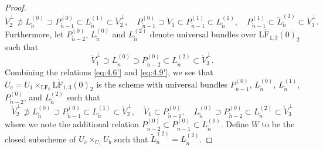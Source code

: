 \documentclass[a4paper]{amsart}
\theoremstyle{plain}
\theoremstyle{definition}
\numberwithin{equation}{section}
\newcommand{\LF}{\mathrm{LF}}
\newcommand{\LFo}{\mathrm{L}\mathring{\mathrm{F}}}
\begin{document}
\begin{proof}
    \begin{equation}\label{eq:4.8'}  	\mathring{V}_2^\perp \not\supset  L_{\mathring{n}}^{(0)} \supset P_{\mathring{n}-1}^{(0)} \subset L_{\mathring{n}}^{(1)} \subset \mathring{V}_2^\perp, \quad    P_{\mathring{n}-1}^{(0)}  \supset 	\mathring{V}_1 \subset   P_{\mathring{n}-1}^{(1)} \subset  L_{\mathring{n}}^{(1)} ,  \quad  P_{\mathring{n}-1}^{(1)} \subset \tilde{L}_{\mathring{n}}^{(2)} \subset \mathring{V}_3^\perp.\end{equation}
    Furthermore, let $P_{\mathring{n}-2}^{(0)}$, $L_{\mathring{n}}^{(0)}$ and ${L}_{\mathring{n}}^{(2)}$ denote universal bundles over $\LFo_{1,3}(0)_2$ such that
    \begin{equation}\label{eq:4.9'}
        \mathring{V}_1^\perp \supset  L_{\mathring{n}}^{(0)} \supset  P_{\mathring{n}-2}^{(0)} \subset {L}_{\mathring{n}}^{(2)} \subset \mathring{V}_3^\perp.  \end{equation}
    Combining the relations \eqref{eq:4.6'} and \eqref{eq:4.9'}, we see that $U_c = U_1 \times_{\LF_0} \LFo_{1,3}(0)_2 $ is the scheme with universal bundles $P_{\mathring{n}-1}^{(0)}$, $L_{\mathring{n}}^{(0)}$,  $L_{\mathring{n}}^{(1)}$,  $P_{\mathring{n}-2}^{(0)}$, and ${L}_{\mathring{n}}^{(2)}$ such that
    \begin{equation}\label{eq:4.10'}  		\mathring{V}_2^\perp \not\supset  L_{\mathring{n}}^{(0)} \supset P_{\mathring{n}-1}^{(0)} \subset L_{\mathring{n}}^{(1)} \subset \mathring{V}_2^\perp, \quad  \mathring{V}_1 \subset  P_{\mathring{n}-1}^{(0)}, \quad L_{\mathring{n}}^{(0)} \supset  P_{\mathring{n}-2}^{(0)} \subset {L}_{\mathring{n}}^{(2)} \subset \mathring{V}_3^\perp
    \end{equation}
    where we note the additional relation  $P_{\mathring{n}-2}^{(0)} \subset P_{\mathring{n}-1}^{(0)} \subset L_{\mathring{n}}^{(0)}$.
    Define $W$ to be the closed subscheme of $U_c \times_{U_1} U_b$ such that $\tilde{L}_{\mathring{n}}^{(2)} = {L}_{\mathring{n}}^{(2)}$.


\end{proof}
\end{document}
